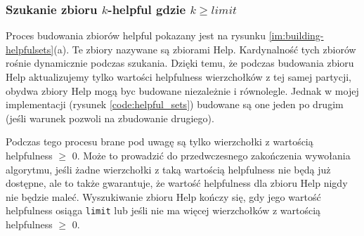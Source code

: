 \subsubsection{Szukanie zbioru $k$-helpful gdzie $k \geq limit$}
Proces budowania zbiorów helpful pokazany jest na rysunku \ref{im:building-helpfulsets}(a).
Te zbiory nazywane są zbiorami Help.
Kardynalność tych zbiorów rośnie dynamicznie podczas szukania.
Dzięki temu, że podczas budowania zbioru Help aktualizujemy tylko wartości helpfulness wierzchołków z tej samej partycji,
obydwa zbiory Help mogą byc budowane niezależnie i równolegle.
Jednak w mojej implementacji (rysunek \ref{code:helpful_sets}) budowane są one jeden po drugim
(jeśli warunek pozwoli na zbudowanie drugiego).

Podczas tego procesu brane pod uwagę są tylko wierzchołki z wartością helpfulness $\geq$ $0$.
Może to prowadzić do przedwczesnego zakończenia wywołania algorytmu, jeśli żadne wierzchołki z taką wartością
helpfulness nie będą już dostępne, ale to także gwarantuje, że wartość helpfulness dla zbioru Help nigdy nie będzie
maleć.
Wyszukiwanie zbioru Help kończy się, gdy jego wartość helpfulness osiąga \texttt{limit} lub jeśli nie ma więcej wierzchołków
z wartością helpfulness $\geq$ $0$.

